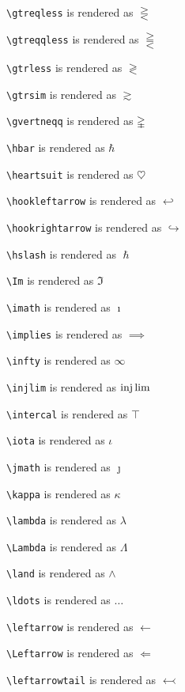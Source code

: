 \texttt{\textbackslash gtreqless} is rendered as $\gtreqless$


\texttt{\textbackslash gtreqqless} is rendered as $\gtreqqless$


\texttt{\textbackslash gtrless} is rendered as $\gtrless$


\texttt{\textbackslash gtrsim} is rendered as $\gtrsim$


\texttt{\textbackslash gvertneqq} is rendered as $\gvertneqq$


\texttt{\textbackslash hbar} is rendered as $\hbar$


\texttt{\textbackslash heartsuit} is rendered as $\heartsuit$


\texttt{\textbackslash hookleftarrow} is rendered as $\hookleftarrow$


\texttt{\textbackslash hookrightarrow} is rendered as $\hookrightarrow$


\texttt{\textbackslash hslash} is rendered as $\hslash$


\texttt{\textbackslash Im} is rendered as $\Im$


\texttt{\textbackslash imath} is rendered as $\imath$


\texttt{\textbackslash implies} is rendered as $\implies$


\texttt{\textbackslash infty} is rendered as $\infty$


\texttt{\textbackslash injlim} is rendered as $\injlim$


\texttt{\textbackslash intercal} is rendered as $\intercal$


\texttt{\textbackslash iota} is rendered as $\iota$


\texttt{\textbackslash jmath} is rendered as $\jmath$


\texttt{\textbackslash kappa} is rendered as $\kappa$


\texttt{\textbackslash lambda} is rendered as $\lambda$


\texttt{\textbackslash Lambda} is rendered as $\Lambda$


\texttt{\textbackslash land} is rendered as $\land$


\texttt{\textbackslash ldots} is rendered as $\ldots$


\texttt{\textbackslash leftarrow} is rendered as $\leftarrow$


\texttt{\textbackslash Leftarrow} is rendered as $\Leftarrow$


\texttt{\textbackslash leftarrowtail} is rendered as $\leftarrowtail$


